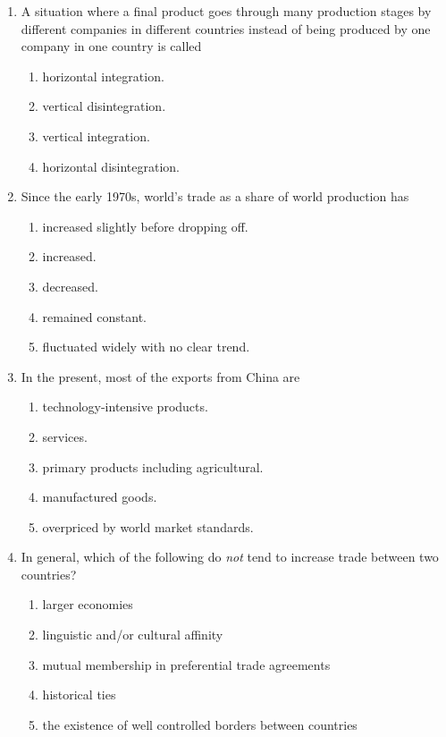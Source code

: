 \documentclass[12pt]{article}
\begin{document}
\begin{enumerate}[label=\textbf{\arabic*.}]
\item A situation where a final product goes through many production stages by different companies in different countries instead of being produced by one company in one country is called
\begin{enumerate}[label=\Alph*.]
\item horizontal integration.
\item vertical disintegration.
\item vertical integration.
\item horizontal disintegration.
\end{enumerate}
\newpage
\item Since the early 1970s, world's trade as a share of world production has
\begin{enumerate}[label=\Alph*.]
\item increased slightly before dropping off.
\item increased.
\item decreased.
\item remained constant.
\item fluctuated widely with no clear trend.
\end{enumerate}

\item In the present, most of the exports from China are
\begin{enumerate}[label=\Alph*.]
\item technology-intensive products.
\item services.
\item primary products including agricultural.
\item manufactured goods.
\item overpriced by world market standards.
\end{enumerate}

\item In general, which of the following do \emph{not} tend to increase trade between two countries?
\begin{enumerate}[label=\Alph*.]
\item larger economies
\item linguistic and/or cultural affinity
\item mutual membership in preferential trade agreements
\item historical ties
\item the existence of well controlled borders between countries
\end{enumerate}


\end{enumerate}
\end{document}
